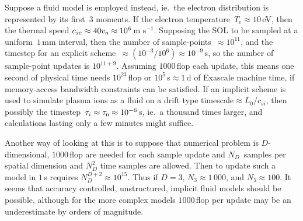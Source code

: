 Suppose a fluid model is employed instead, ie.\ the electron distribution is
represented by its first~$3$ moments.
If the electron temperature~$T_e \approx 10$\,eV, then the
thermal speed $c_{se}\approx 40 v_{\sf n} \approx 10^6$\,m s$^{-1}$. Supposing the SOL to be sampled at a
uniform~$1$\,mm interval, then the
number of sample-points~$\approx 10^{11}$, and the timestep for an explicit scheme~$\approx (10^{-3} /10^6)\approx 10^{-9}$\,s,
so the number of sample-point updates is $10^{11+9}$. Assuming  $1000$\,flop each update, this
means one second of physical time needs $10^{23}$\,flop or $10^5$\,s$\approx 1$\,d
of Exascale machine time, if memory-access bandwidth constraints can be satisfied. If an implicit scheme
is used to simulate plasma ions as a fluid on a drift type timescale$\approx L_0/c_{si}$, then
possibly the timestep~$\tau_i\approx \tau_{\sf n}\approx 10^{-6}$\,s, ie.\ a thousand times larger, and
calculations lasting only a few minutes might suffice.

Another way of looking at this is to suppose that numerical problem is $D$-dimensional, $1000$\,flop
are needed for each sample update
and $N_D$~samples per spatial dimension and $N_D^2$ time samples are allowed. Then to update
such a model in $1$\,s requires
$N_D^{D+2} \approx 10^{15}$. Thus  if $D=3$, $N_3 \approx 1\,000$, and $N_5 \approx 100$.
It seems that accuracy controlled, unstructured, implicit fluid models should be possible,
although for the more complex models $1000$\,flop per update may be an underestimate by
orders of magnitude.

